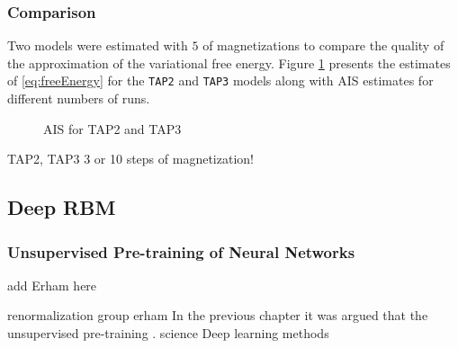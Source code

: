 \documentclass[../report/report.tex]{subfiles}
\begin{document}
\subsubsection{Comparison}
Two models were estimated with $5$ of magnetizations to compare the quality of the approximation of the variational free energy. Figure \ref{fig:AISTAP2} presents the estimates of \ref{eq:freeEnergy} for the \verb|TAP2| and \verb|TAP3| models along with AIS estimates for different numbers of runs.

\begin{figure}[!htb]
\label{fig:AISTAP2}
  \caption[1]{AIS for TAP2 and TAP3}
\end{figure}
TAP2, TAP3
3 or 10 steps of magnetization!

\subsection{Deep RBM}
\subsubsection{Unsupervised Pre-training of Neural Networks}
add Erham here

renormalization group
erham
In the previous chapter it was argued that the unsupervised pre-training . 
science
Deep learning methods
\end{document}
